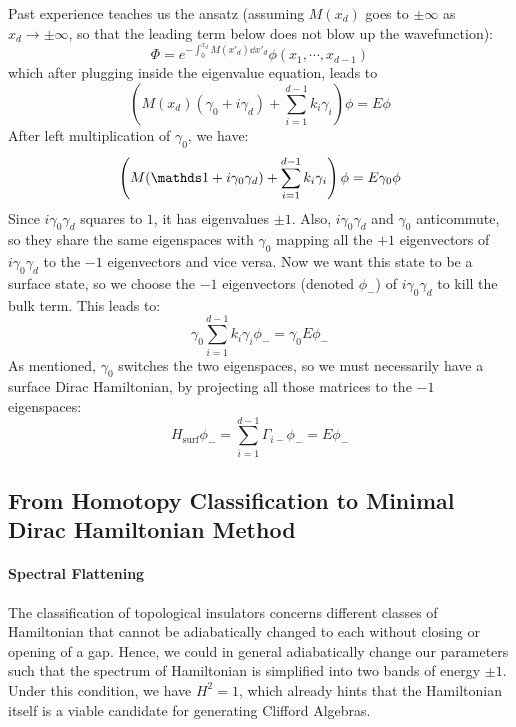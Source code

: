 Past experience teaches us the ansatz (assuming
$M(x_d)$ goes to $\pm\infty$ as $x_d\to\pm\infty$, so that the leading term below
does not blow up the wavefunction):
\begin{equation}
    \Phi = e^{-\int_0^{x_d} M(x'_d)\dd{x'_d}} \phi(x_1,\cdots,x_{d-1})
\end{equation}
which after plugging inside the eigenvalue equation, leads to
\begin{equation}
    \left( M(x_d)(\gamma_0 + i\gamma_d) + \sum_{i=1}^{d-1} k_i\gamma_i \right) \phi
    = E \phi
\end{equation}
After left multiplication of $\gamma_0$, we have:
\begin{equation}
    \left( M(\id + i\gamma_0\gamma_d) + \sum_{i=1}^{d-1} k_i\gamma_i  \right) \phi
    = E \gamma_0 \phi
\end{equation}
Since $i\gamma_0\gamma_d$ squares to $1$, it has eigenvalues $\pm1$. Also,
$i\gamma_0\gamma_d$ and $\gamma_0$ anticommute, so they share the same
eigenspaces with $\gamma_0$ mapping all the $+1$ eigenvectors of
$i\gamma_0\gamma_d$ to the $-1$ eigenvectors and vice versa. Now we want this
state to be a surface state, so we choose the $-1$ eigenvectors (denoted
$\phi_-$) of $i\gamma_0\gamma_d$ to kill the bulk term. This leads to:
\begin{equation}
    \gamma_0 \sum_{i=1}^{d-1} k_i\gamma_i \phi_- = \gamma_0 E\phi_-
\end{equation}
As mentioned, $\gamma_0$ switches the two eigenspaces, so we must necessarily
have a surface Dirac Hamiltonian, by projecting all those matrices to the $-1$
eigenspaces:
\begin{equation}
    \label{eq:H-Dirac-surf}
    H_\mathrm{surf} \phi_- = \sum_{i=1}^{d-1} \Gamma_{i-} \phi_- = E \phi_-
\end{equation}


\subsection{From Homotopy Classification to Minimal Dirac Hamiltonian Method}
\label{sec:Homotopy to Minimal Dirac}

\paragraph{Spectral Flattening} The classification of topological insulators
concerns different classes of Hamiltonian that cannot be adiabatically changed
to each without closing or opening of a gap. Hence, we could in general
adiabatically change our parameters such that the spectrum of Hamiltonian is
simplified into two bands of energy $\pm1$. Under this condition, we have
$H^2=1$, which already hints that the Hamiltonian itself is a viable candidate
for generating Clifford Algebras. 

